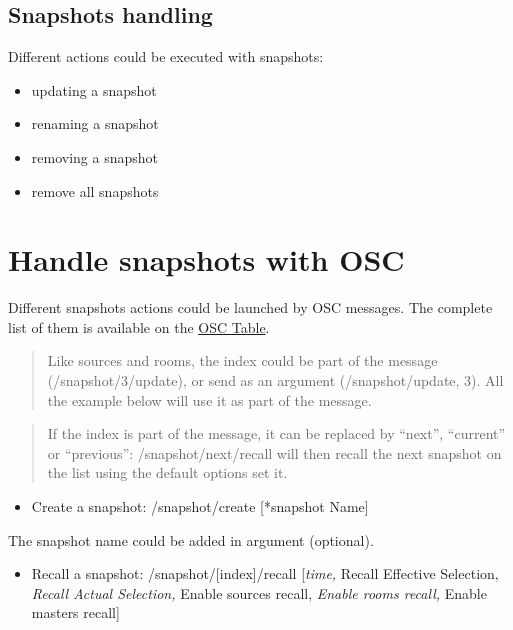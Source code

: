 \documentclass[
  letterpaper,
  DIV=11,
  numbers=noendperiod]{scrreport}
\providecommand{\tightlist}{%
  \setlength{\itemsep}{0pt}\setlength{\parskip}{0pt}}\usepackage{longtable,booktabs,array}
\begin{document}
\hypertarget{snapshots-handling}{%
\section{Snapshots handling}\label{snapshots-handling}}

Different actions could be executed with snapshots:

\begin{itemize}
\item
  updating a snapshot
\item
  renaming a snapshot
\item
  removing a snapshot
\item
  remove all snapshots
\end{itemize}

\hypertarget{handle-snapshots-with-osc}{%
\chapter{Handle snapshots with OSC}\label{handle-snapshots-with-osc}}

Different snapshots actions could be launched by OSC messages. The
complete list of them is available on the
\href{Appendix_C_OSC_Table.md}{OSC Table}.

\begin{quote}
Like sources and rooms, the index could be part of the message
(/snapshot/3/update), or send as an argument (/snapshot/update, 3). All
the example below will use it as part of the message.
\end{quote}

\begin{quote}
If the index is part of the message, it can be replaced by ``next'',
``current'' or ``previous'': /snapshot/next/recall will then recall the
next snapshot on the list using the default options set it.
\end{quote}

\begin{itemize}
\tightlist
\item
  Create a snapshot: /snapshot/create {[}*snapshot Name{]}
\end{itemize}

The snapshot name could be added in argument (optional).

\begin{itemize}
\tightlist
\item
  Recall a snapshot: /snapshot/{[}index{]}/recall {[}\emph{time, }Recall
  Effective Selection, \emph{Recall Actual Selection, }Enable sources
  recall, \emph{Enable rooms recall, }Enable masters recall{]}
\end{itemize}
\end{document}
